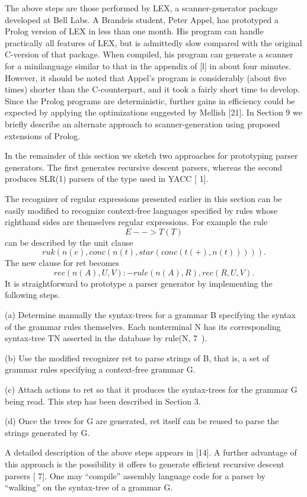 The above steps are those performed by LEX, a scanner-generator package
developed at Bell Labs. A Brandeis student, Peter Appel, has prototyped a Prolog
version of LEX in less than one month. His program can handle practically all
features of LEX, but is admittedly slow compared with the original C-version of
that package. When compiled, his program can generate a scanner for a minilanguage
similar to that in the appendix of [l] in about four minutes. However,
it should be noted that Appel’s program is considerably (about five times) shorter
than the C-counterpart, and it took a fairly short time to develop. Since the
Prolog programs are deterministic, further gains in efficiency could be expected
by applying the optimizations suggested by Mellish [21]. In Section 9 we briefly
describe an alternate approach to scanner-generation using proposed extensions
of Prolog. 

In the remainder of this section we sketch two approaches for prototyping
parser generators. The first generates recursive descent parsers, whereas the
second produces SLR(1) parsers of the type used in YACC [ 1].

The recognizer of regular expressions presented earlier in this section can be
easily modified to recognize context-free languages specified by rules whose righthand
sides are themselves regular expressions. For example the rule
\[E --> T(T)\]
can be described by the unit clause
\[ruk(n(e), conc(n(t), star(conc(t(+), n(t))))).\]
The new clause for ret becomes
\[rec(n(A), U, V) :- rule(n(A), R), rec(R, U, V).\]
It is straightforward to prototype a parser generator by implementing the
following steps.

(a) Determine manually the syntax-trees for a grammar B specifying the syntax
of the grammar rules themselves. Each nonterminal N has its corresponding
syntax-tree TN asserted in the database by rule(N, 7~).

(b) Use the modified recognizer ret to parse strings of B, that is, a set of grammar
rules specifying a context-free grammar G.

(c) Attach actions to ret so that it produces the syntax-trees for the grammar G
being read. This step has been described in Section 3.

(d) Once the trees for G are generated, ret itself can be reused to parse the
strings generated by G.

A detailed description of the above steps appears in [14]. A further advantage of
this approach is the possibility it offers to generate efficient recursive descent
parsers [ 7]. One may “compile” assembly language code for a parser by “walking”
on the syntax-tree of a grammar G. 

